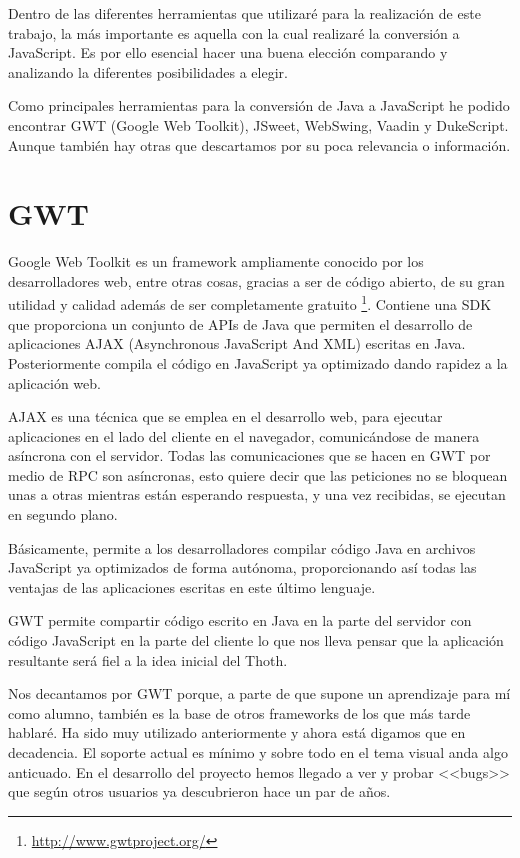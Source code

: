 
Dentro de las diferentes herramientas que utilizaré para la realización de este trabajo, la más importante es aquella con la cual realizaré la conversión a JavaScript. Es por ello esencial hacer una buena elección comparando y analizando la diferentes posibilidades a elegir.

Como principales herramientas para la conversión de Java a JavaScript he podido encontrar GWT (Google Web Toolkit), JSweet, WebSwing, Vaadin y DukeScript. Aunque también hay otras que descartamos por su poca relevancia o información.

\section{GWT}

Google Web Toolkit es un framework ampliamente conocido por los desarrolladores web, entre otras cosas, gracias a ser de código abierto, de su gran utilidad y calidad además de ser completamente gratuito \footnote{\url{http://www.gwtproject.org/}}.
Contiene una SDK que proporciona un conjunto de APIs de Java que permiten el desarrollo de aplicaciones AJAX (Asynchronous JavaScript And XML) escritas en Java. Posteriormente compila el código en JavaScript ya optimizado dando rapidez a la aplicación web. 

AJAX es una técnica que se emplea en el desarrollo web, para ejecutar aplicaciones en el lado del cliente en el navegador, comunicándose de manera asíncrona con el servidor. Todas las comunicaciones que se hacen en GWT por medio de RPC son asíncronas, esto quiere decir que las peticiones no se bloquean unas a otras mientras están esperando respuesta, y una vez recibidas, se ejecutan en segundo plano.

Básicamente, permite a los desarrolladores compilar código Java en archivos JavaScript ya optimizados de forma autónoma, proporcionando así todas las ventajas de las aplicaciones escritas en este último lenguaje. 

GWT permite compartir código escrito en Java en la parte del servidor con código JavaScript en la parte del cliente lo que nos lleva pensar que la aplicación resultante será fiel a la idea inicial del Thoth. 

Nos decantamos por GWT porque, a parte de que supone un aprendizaje para mí como alumno, también es la base de otros frameworks de los que más tarde hablaré. Ha sido muy utilizado anteriormente y ahora está digamos que en decadencia. El soporte actual es mínimo y sobre todo en el tema visual anda algo anticuado. En el desarrollo del proyecto hemos llegado a ver  y probar <<bugs>> que según otros usuarios ya descubrieron hace un par de años.

